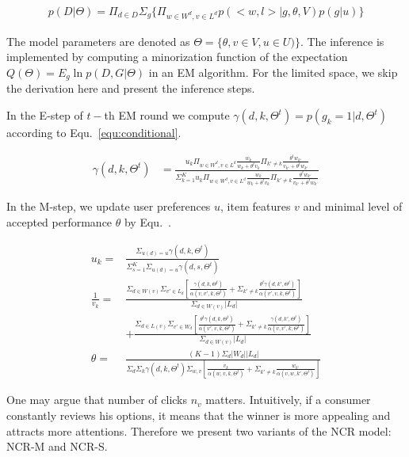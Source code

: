\documentclass[sigconf]{acmart}
\begin{document}
\begin{align}\label{equ:likelihood}
		p(D|\Theta)=\Pi_{d\in D} \Sigma_{g} \{\Pi_{w\in W^d, v\in L^d} p(<w,l>|g,\theta,V) p(g|u)\}
\end{align}

The model parameters are denoted as $\Theta=\{\theta,v\in V, u\in U)\}$.  The inference is implemented by computing a minorization function of the expectation $Q(\Theta)=E_g \ln p(D,G|\Theta) $ in an EM algorithm. For the limited space, we skip the derivation here and present the inference steps. 

In the E-step of $t-$th  EM round we compute $\gamma(d,k,\Theta^t)=p(g_k=1|d,\Theta^t)$ according to Equ.~\ref{equ:conditional}.

\begin{align}\label{equ:conditional}
\gamma(d,k,\Theta^t) &=\frac{u_k \Pi_{w \in W^d, v\in L^d} \frac{w_k}{w_k+\theta^t v_k}\Pi_{k'\neq k}\frac{\theta^t w_{k'}}{v_{k'}+\theta^t w_{k'}}}{\Sigma_{k=1}^K u_k \Pi_{w \in W^d, v\in L^d} \frac{w_k}{w_k+\theta^t v_k}\Pi_{k'\neq k}\frac{\theta^t w_{k'}}{v_{k'}+\theta^t w_{k'}}}
\end{align}

In the M-step, we update user preferences $u$, item features $v$ and minimal level of accepted performance $\theta$ by Equ.~\label{equ:update}. 

\begin{align}\label{equ:update}
u_k = & \frac{\Sigma_{u(d)=u}\gamma(d,k,\Theta^t)}{\Sigma_{s=1}^K \Sigma_{u(d)=u}\gamma(d,s,\Theta^t)} \\\nonumber
\frac{1}{v_k}= &\frac{\Sigma_{d\in W(v)}\Sigma_{v'\in L_d} [\frac{\gamma(d,k,\Theta^t)}{ \alpha(v,v',k,\Theta^t)} +\Sigma_{k'\neq k}\frac{\theta^t\gamma(d,k',\Theta^t)}{\alpha(v',v,k,\Theta^t)}]}{\Sigma_{d\in W(v)}|L_d|}\\\nonumber
 & + \frac{\Sigma_{d\in L(v)}\Sigma_{v'\in W_d} [\frac{\theta^t \gamma(d,k,\Theta^t)}{\alpha(v',v,k,\Theta^t)}+\Sigma_{k'\neq k} \frac{\gamma(d,k',\Theta^t)}{\alpha(v,v',k,\Theta^t)}] }{\Sigma_{d\in W(v)}|L_d|}\\\nonumber
\theta = & \frac{(K-1)\Sigma_d |W_d| |L_d|}{\Sigma_d \Sigma_k \gamma(d,k,\Theta^t)\Sigma_{w,v} [\frac{v_k}{\alpha(w,v,k,\Theta^t)}+\Sigma_{k'\neq k} \frac{w_{k'}}{\alpha(v,w,k',\Theta^t)}]}
\end{align}

One may argue that number of clicks $n_v$ matters. Intuitively, if a consumer constantly reviews his options, it means that the winner is more appealing and attracts more attentions. Therefore we present two variants of the NCR model: NCR-M and NCR-S.
\end{document}
